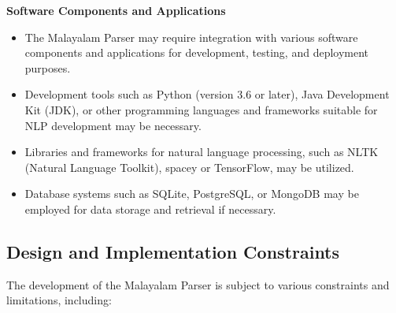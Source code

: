 \documentclass[12pt]{article}
\begin{document}
	\textbf{Software Components and Applications}
	
	\begin{itemize}[label=-]
		\item The Malayalam Parser may require integration with various software components and applications for development, testing, and deployment purposes.
		\item Development tools such as Python (version 3.6 or later), Java Development Kit (JDK), or other programming languages and frameworks suitable for NLP development may be necessary.
		\item Libraries and frameworks for natural language processing, such as NLTK (Natural Language Toolkit), spacey or TensorFlow, may be utilized.
		\item Database systems such as SQLite, PostgreSQL, or MongoDB may be employed for data storage and retrieval if necessary.
	\end{itemize}
	
	\subsection{Design and Implementation Constraints}
	The development of the Malayalam Parser is subject to various constraints and limitations, including:
	
\end{document}
